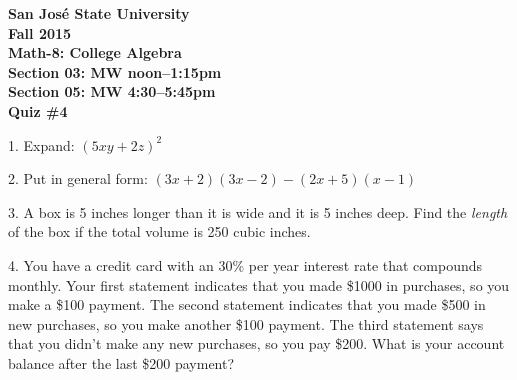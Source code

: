 \documentclass[letterpaper, 12pt]{article}
\begin{document}
\begin{center}
\bfseries
San Jos\'{e} State University \\
Fall 2015 \\
Math-8: College Algebra \\
Section 03: MW noon--1:15pm \\
Section 05: MW 4:30--5:45pm \\
\bigskip
Quiz \#4
\end{center}

\bigskip

1. Expand: $(5xy+2z)^2$

\vspace{3in}

2. Put in general form: $(3x+2)(3x-2)-(2x+5)(x-1)$

\newpage

3. A box is 5 inches longer than it is wide and it is 5 inches deep. Find the
\emph{length} of the box if the total volume is 250 cubic inches.

\vspace{3in}

4. You have a credit card with an 30\% per year interest rate that compounds
monthly. Your first statement indicates that you made \$1000 in purchases, so
you make a \$100 payment.  The second statement indicates that you made \$500 in
new purchases, so you make another \$100 payment. The third statement says that
you didn't make any new purchases, so you pay \$200.  What is your account
balance after the last \$200 payment?
\end{document}
